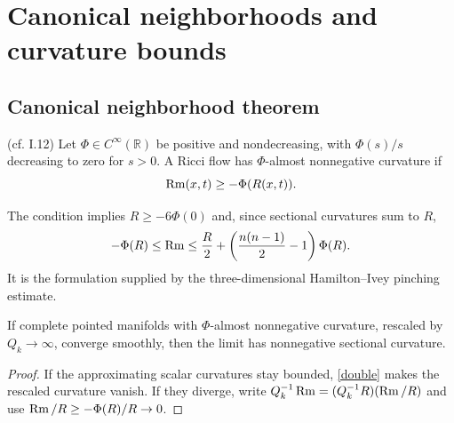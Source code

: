 \section{Canonical neighborhoods and curvature bounds}
\subsection{Canonical neighborhood theorem}
\label{I.12.1}
\begin{definition}
\label{def:kl-canonical-neighborhood-theorem-almost-nonnegative-curvature}

(cf. I.12) \label{pinchingdef}
Let $\Phi\in C^\infty(\mathbb R)$ be positive and nondecreasing, with
$\Phi(s)/s$ decreasing to zero for $s>0$.  A Ricci flow has
$\Phi$-almost nonnegative curvature if
\begin{equation}\label{phieqnn}
\operatorname{Rm}(x,t)\geq-\Phi(R(x,t)).
\end{equation}
\end{definition}
\begin{remark}
\label{rem:kl-canonical-neighborhood-theorem-existence-canonical-neighborhoods}


The condition implies $R\geq-6\Phi(0)$ and, since sectional curvatures sum
to $R$,
\begin{equation}\label{double}
-\Phi(R)\leq\operatorname{Rm}\leq\frac R2+
\left(\frac{n(n-1)}2-1\right)\Phi(R).
\end{equation}
It is the formulation supplied by the three-dimensional Hamilton--Ivey
pinching estimate.
\end{remark}
\begin{lemma}
\label{lem:kl-canonical-neighborhood-theorem-convergence-canonical-neighborhoods}

\label{almost nonneg}
If complete pointed manifolds with $\Phi$-almost nonnegative curvature,
rescaled by $Q_k\to\infty$, converge smoothly, then the limit has
nonnegative sectional curvature.
\end{lemma}
\begin{proof}
\sketch If the approximating scalar curvatures stay bounded, \eqref{double}
makes the rescaled curvature vanish.  If they diverge, write
$Q_k^{-1}\operatorname{Rm}=(Q_k^{-1}R)(\operatorname{Rm}/R)$ and use
$\operatorname{Rm}/R\geq-\Phi(R)/R\to0$.
\end{proof}
